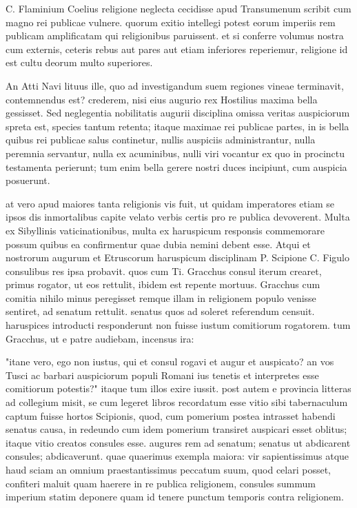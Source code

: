  C. Flaminium Coelius religione neglecta cecidisse apud Transumenum scribit cum magno rei publicae vulnere. quorum exitio intellegi potest eorum imperiis rem publicam amplificatam qui religionibus paruissent. et si conferre volumus nostra cum externis, ceteris rebus aut pares aut etiam inferiores reperiemur, religione id est cultu deorum multo superiores.

 An Atti Navi lituus ille, quo ad investigandum suem regiones vineae terminavit, contemnendus est? crederem, nisi eius augurio rex Hostilius maxima bella gessisset. Sed neglegentia nobilitatis augurii disciplina omissa veritas auspiciorum spreta est, species tantum retenta; itaque maximae rei publicae partes, in is bella quibus rei publicae salus continetur, nullis auspiciis administrantur, nulla peremnia servantur, nulla ex acuminibus, nulli viri vocantur ex quo in procinctu testamenta perierunt; tum enim bella gerere nostri duces incipiunt, cum auspicia posuerunt.

 at vero apud maiores tanta religionis vis fuit, ut quidam imperatores etiam se ipsos dis inmortalibus capite velato verbis certis pro re publica devoverent. Multa ex Sibyllinis vaticinationibus, multa ex haruspicum responsis commemorare possum quibus ea confirmentur quae dubia nemini debent esse. Atqui et nostrorum augurum et Etruscorum haruspicum disciplinam P. Scipione C. Figulo consulibus res ipsa probavit. quos cum Ti. Gracchus consul iterum crearet, primus rogator, ut eos rettulit, ibidem est repente mortuus. Gracchus cum comitia nihilo minus peregisset remque illam in religionem populo venisse sentiret, ad senatum rettulit. senatus quos ad soleret referendum censuit. haruspices introducti responderunt non fuisse iustum comitiorum rogatorem. tum Gracchus, ut e patre audiebam, incensus ira:

 "itane vero, ego non iustus, qui et consul rogavi et augur et auspicato? an vos Tusci ac barbari auspiciorum populi Romani ius tenetis et interpretes esse comitiorum potestis?" itaque tum illos exire iussit. post autem e provincia litteras ad collegium misit, se cum legeret libros recordatum esse vitio sibi tabernaculum captum fuisse hortos Scipionis, quod, cum pomerium postea intrasset habendi senatus causa, in redeundo cum idem pomerium transiret auspicari esset oblitus; itaque vitio creatos consules esse. augures rem ad senatum; senatus ut abdicarent consules; abdicaverunt. quae quaerimus exempla maiora: vir sapientissimus atque haud sciam an omnium praestantissimus peccatum suum, quod celari posset, confiteri maluit quam haerere in re publica religionem, consules summum imperium statim deponere quam id tenere punctum temporis contra religionem.

